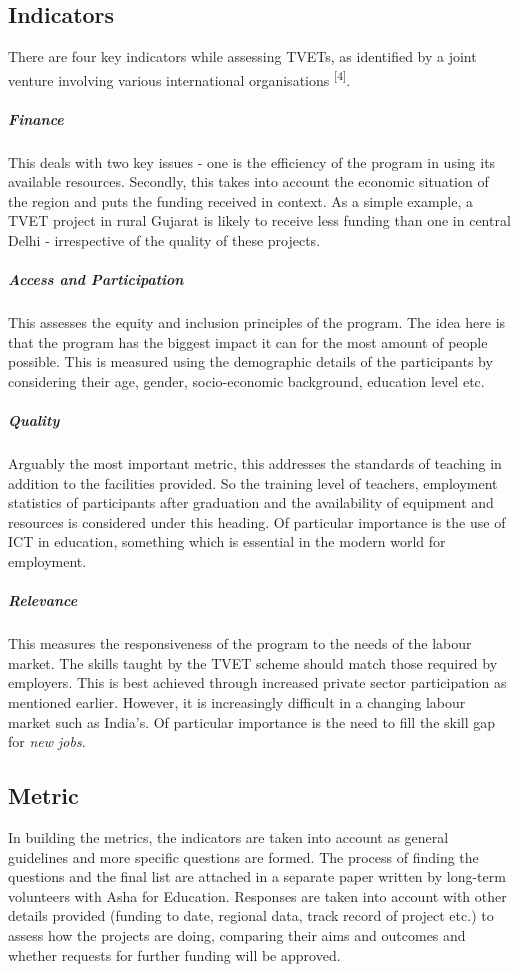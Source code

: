 \documentclass[a4paper, 10pt]{article}
\begin{document}
\subsection*{Indicators}
There are four key indicators while assessing TVETs, as identified by a joint venture involving various international organisations \textsuperscript{[4]}.

\subparagraph*{Finance} 
This deals with two key issues - one is the efficiency of the program in using its available resources. Secondly, this takes into account the economic situation of the region and puts the funding received in context. As a simple example, a TVET project in rural Gujarat is likely to receive less funding than one in central Delhi - irrespective of the quality of these projects. 

\subparagraph*{Access and Participation}
This assesses the equity and inclusion principles of the program. The idea here is that the program has the biggest impact it can for the most amount of people possible. This is measured using the demographic details of the participants by considering their age, gender, socio-economic background, education level etc.

\subparagraph*{Quality}
Arguably the most important metric, this addresses the standards of teaching in addition to the facilities provided. So the training level of teachers, employment statistics of participants after graduation and the availability of equipment and resources is considered under this heading. Of particular importance is the use of ICT in education, something which is essential in the modern world for employment. 

\subparagraph*{Relevance}
This measures the responsiveness of the program to the needs of the labour market. The skills taught by the TVET scheme should match those required by employers. This is best achieved through increased private sector participation as mentioned earlier. However, it is increasingly difficult in a changing labour market such as India's. Of particular importance is the need to fill the skill gap for \textit{new jobs}. 

\subsection*{Metric}
In building the metrics, the indicators are taken into account as general guidelines and more specific questions are formed. The process of finding the questions and the final list are attached in a separate paper written by long-term volunteers with Asha for Education. Responses are taken into account with other details provided (funding to date, regional data, track record of project etc.) to assess how the projects are doing, comparing their aims and outcomes and whether requests for further funding will be approved. 
\end{document}

